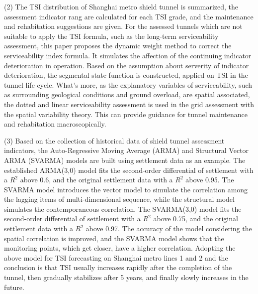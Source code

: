 \begin{eabstract}
(2) The TSI distribution of Shanghai metro shield tunnel is summarized, the assessment indicator rang are calculated for each TSI grade, and the maintenance and rehabitation suggestions are given. For the assessed tunnels which are not suitable to apply the TSI formula, such as the long-term serviceability assessment, this paper proposes the dynamic weight method to correct the serviceability index formula. It simulates the affection of the continuing indicator deterioration in operation. Based on the assumption about serverity of indicator deterioration, the segmental state function is constructed, applied on TSI in the tunnel life cycle. What's more, as the explanatory variables of serviceability, such as surrounding geological conditions and ground overload, are spatial associated, the dotted and linear serviceability assessment is used in the grid assessment with the spatial variability theory. This can provide guidance for tunnel maintenance and rehabitation macroscopically.

(3) Based on the collection of historical data of shield tunnel assessment indicators, the Auto-Regressive Moving Average (ARMA) and Structural Vector ARMA (SVARMA) models are built using settlement data as an example. The established ARMA(3,0) model fits the second-order differential of settlement with a $R^2$ above 0.6, and the original settlement data with a $R^2$ above 0.95. The SVARMA model introduces the vector model to simulate the correlation among the lagging items of multi-dimensional sequence, while the structural model simulates the contemporaneous correlation. The SVARMA(3,0) model fits the second-order differential of settlement with a $R^2$ above 0.75, and the original settlement data with a $R^2$ above 0.97. The accuracy of the model considering the spatial correlation is improved, and the SVARMA model shows that the monitoring points, which get closer, have a higher correlation. Adopting the above model for TSI forecasting on Shanghai metro lines 1 and 2 and the conclusion is that TSI usually increases rapidly after the completion of the tunnel, then gradually stabilizes after 5 years, and finally slowly increases in the future.


\end{eabstract}
